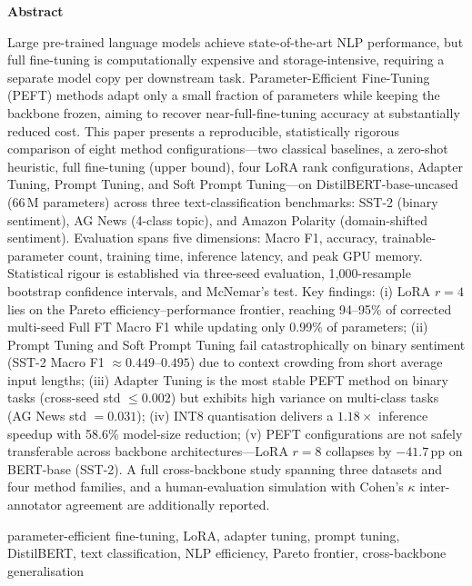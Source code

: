 \documentclass[conference]{IEEEtran}
\renewenvironment{abstract}{%
  \par\noindent
  \begin{center}{\normalfont\bfseries\large Abstract}\end{center}%
  \par\noindent\small\ignorespaces
}{\par\medskip}
\begin{document}
\begin{abstract}
Large pre-trained language models achieve state-of-the-art NLP performance, but full fine-tuning is computationally expensive and storage-intensive, requiring a separate model copy per downstream task. Parameter-Efficient Fine-Tuning (PEFT) methods adapt only a small fraction of parameters while keeping the backbone frozen, aiming to recover near-full-fine-tuning accuracy at substantially reduced cost. This paper presents a reproducible, statistically rigorous comparison of eight method configurations---two classical baselines, a zero-shot heuristic, full fine-tuning (upper bound), four LoRA rank configurations, Adapter Tuning, Prompt Tuning, and Soft Prompt Tuning---on DistilBERT-base-uncased (66\,M parameters) across three text-classification benchmarks: SST-2 (binary sentiment), AG News (4-class topic), and Amazon Polarity (domain-shifted sentiment). Evaluation spans five dimensions: Macro F1, accuracy, trainable-parameter count, training time, inference latency, and peak GPU memory. Statistical rigour is established via three-seed evaluation, 1{,}000-resample bootstrap confidence intervals, and McNemar's test. Key findings: (i) LoRA $r{=}4$ lies on the Pareto efficiency--performance frontier, reaching 94--95\% of corrected multi-seed Full FT Macro F1 while updating only 0.99\% of parameters; (ii) Prompt Tuning and Soft Prompt Tuning fail catastrophically on binary sentiment (SST-2 Macro F1 ${\approx}0.449$--$0.495$) due to context crowding from short average input lengths; (iii) Adapter Tuning is the most stable PEFT method on binary tasks (cross-seed std ${\leq}0.002$) but exhibits high variance on multi-class tasks (AG News std $=0.031$); (iv) INT8 quantisation delivers a $1.18\times$ inference speedup with 58.6\% model-size reduction; (v) PEFT configurations are not safely transferable across backbone architectures---LoRA $r{=}8$ collapses by $-41.7$\,pp on BERT-base (SST-2). A full cross-backbone study spanning three datasets and four method families, and a human-evaluation simulation with Cohen's $\kappa$ inter-annotator agreement are additionally reported.
\end{abstract}

\begin{IEEEkeywords}
parameter-efficient fine-tuning, LoRA, adapter tuning, prompt tuning, DistilBERT, text classification, NLP efficiency, Pareto frontier, cross-backbone generalisation
\end{IEEEkeywords}

\end{document}
